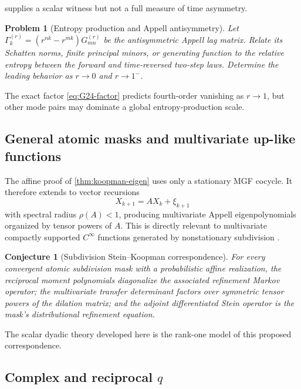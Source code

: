\documentclass[11pt,a4paper]{article}
\newtheorem{conjecture}[theorem]{Conjecture}
\newtheorem{problem}[theorem]{Problem}
\theoremstyle{definition}
\theoremstyle{remark}
\begin{document}
 supplies a scalar witness but not a full measure of time asymmetry.

\begin{problem}[Entropy production and Appell antisymmetry]
Let $\Gamma_k^{(r)}=(r^{nk}-r^{mk})G_{mn}^{(r)}$ be the antisymmetric Appell lag matrix. Relate its Schatten norms, finite principal minors, or generating function to the relative entropy between the forward and time-reversed two-step laws. Determine the leading behavior as $r\to0$ and $r\to1^-$.
\end{problem}

The exact factor \eqref{eq:G24-factor} predicts fourth-order vanishing as $r\to1$, but other mode pairs may dominate a global entropy-production scale.

\subsection{General atomic masks and multivariate up-like functions}

The affine proof of \cref{thm:koopman-eigen} uses only a stationary MGF cocycle. It therefore extends to vector recursions
\begin{equation}
 X_{k+1}=AX_k+\xi_{k+1}
 \label{eq:vector-AR}
\end{equation}
with spectral radius $\rho(A)<1$, producing multivariate Appell eigenpolynomials organized by tensor powers of $A$. This is directly relevant to multivariate compactly supported $C^\infty$ functions generated by nonstationary subdivision \cite{CharinaContiDyn}.

\begin{conjecture}[Subdivision Stein--Koopman correspondence]
For every convergent atomic subdivision mask with a probabilistic affine realization, the reciprocal moment polynomials diagonalize the associated refinement Markov operator; the multivariate transfer determinant factors over symmetric tensor powers of the dilation matrix; and the adjoint differentiated Stein operator is the mask's distributional refinement equation.
\end{conjecture}

The scalar dyadic theory developed here is the rank-one model of this proposed correspondence.

\subsection{\texorpdfstring{Complex and reciprocal $q$}{Complex and reciprocal q}}
\end{document}
